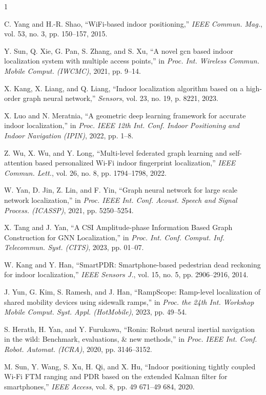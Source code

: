 \documentclass[journal]{IEEEtran}
\begin{document}
\ifCLASSOPTIONcaptionsoff
  \newpage
\fi

\begin{thebibliography}{1}

C. Yang and H.-R. Shao, ``WiFi-based indoor positioning,'' \emph{IEEE Commun. Mag.}, vol. 53, no. 3, pp. 150–157, 2015.

Y. Sun, Q. Xie, G. Pan, S. Zhang, and S. Xu, ``A novel gcn based indoor localization system with multiple access points,'' in \emph{Proc. Int. Wireless Commun. Mobile Comput. (IWCMC)}, 2021, pp. 9–14.

X. Kang, X. Liang, and Q. Liang, ``Indoor localization algorithm based on a high-order graph neural network,'' \emph{Sensors}, vol. 23, no. 19, p. 8221, 2023.

X. Luo and N. Meratnia, ``A geometric deep learning framework for accurate indoor localization,'' in \emph{Proc. IEEE 12th Int. Conf. Indoor Positioning and Indoor Navigation (IPIN)}, 2022, pp. 1–8.

Z. Wu, X. Wu, and Y. Long, ``Multi-level federated graph learning and self-attention based personalized Wi-Fi indoor fingerprint localization,'' \emph{IEEE Commun. Lett.}, vol. 26, no. 8, pp. 1794–1798, 2022.

W. Yan, D. Jin, Z. Lin, and F. Yin, ``Graph neural network for large scale network localization,'' in \emph{Proc. IEEE Int. Conf. Acoust. Speech and Signal Process. (ICASSP)}, 2021, pp. 5250–5254.

X. Tang and J. Yan, ``A CSI Amplitude-phase Information Based Graph Construction for GNN Localization,'' in \emph{Proc. Int. Conf. Comput. Inf. Telecommun. Syst. (CITS)}, 2023, pp. 01–07.

W. Kang and Y. Han, ``SmartPDR: Smartphone-based pedestrian dead reckoning for indoor localization,'' \emph{IEEE Sensors J.}, vol. 15, no. 5, pp. 2906–2916, 2014.

J. Yun, G. Kim, S. Ramesh, and J. Han, ``RampScope: Ramp-level localization of shared mobility devices using sidewalk ramps,'' in \emph{Proc. the 24th Int. Workshop Mobile Comput. Syst. Appl. (HotMobile)}, 2023, pp. 49–54.

S. Herath, H. Yan, and Y. Furukawa, ``Ronin: Robust neural inertial navigation in the wild: Benchmark, evaluations, \& new methods,'' in \emph{Proc. IEEE Int. Conf. Robot. Automat. (ICRA)}, 2020, pp. 3146–3152.

M. Sun, Y. Wang, S. Xu, H. Qi, and X. Hu, ``Indoor positioning tightly coupled Wi-Fi FTM ranging and PDR based on the extended Kalman filter for smartphones,'' \emph{IEEE Access}, vol. 8, pp. 49 671–49 684, 2020.


\end{thebibliography}
\end{document}

